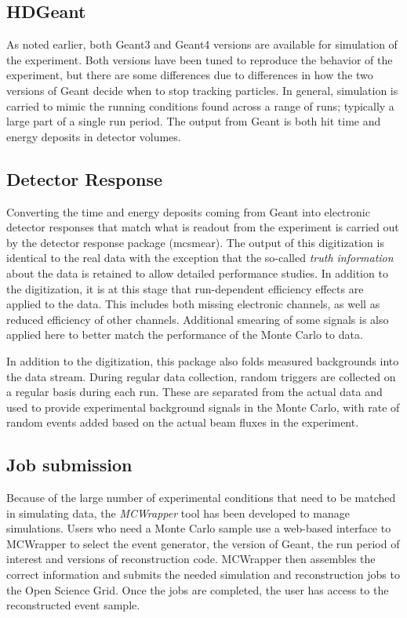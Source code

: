 \subsection{HDGeant \label{sec:hdgeant}}
As noted earlier, both Geant3 and Geant4 versions are available for simulation of the experiment. Both versions have been tuned to reproduce the behavior of the experiment, but there are some differences due to differences in how the two versions of Geant decide when to stop tracking particles. In general, simulation is carried to mimic the running conditions found across a range of runs; typically a large part of a single run period. The output from Geant is both hit time and energy deposits in detector volumes. 

\subsection[mcsmear]{Detector Response}
Converting the time and energy deposits coming from Geant into electronic detector responses that match what is readout from the experiment is carried out by the detector response package (mcsmear). The output of this digitization is identical to the real data with the exception that the so-called \emph{truth information} about the data is retained to allow detailed performance studies. In addition to the digitization, it is at this stage that run-dependent efficiency effects are applied to the data. This includes both missing electronic channels, as well as reduced efficiency of other channels. Additional smearing of some signals is also applied here to better match the performance of the Monte Carlo to data. 

In addition to the digitization, this package also folds measured backgrounds into the data stream. During regular data collection, random triggers are collected on a regular basis during each run. These are separated from the actual data and used to provide experimental background signals in the Monte Carlo, with rate of random events added based on the actual beam fluxes in the experiment. 

\subsection{Job submission \label{sec:jobsubmission}}
Because of the large number of experimental conditions that need to be matched in simulating data, the \emph{MCWrapper} tool has been developed to manage simulations. Users who need a Monte Carlo sample use a web-based interface to MCWrapper to select the event generator, the version of Geant, the run period of interest and versions of reconstruction code. MCWrapper then assembles the correct information and submits the needed simulation and reconstruction jobs to the Open Science Grid. Once the jobs are completed, the user has access to the reconstructed event sample.